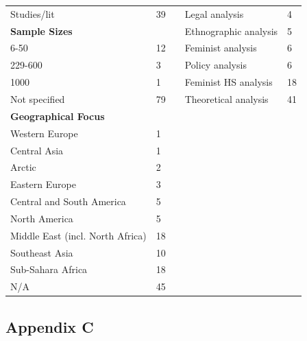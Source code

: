 \documentclass[10pt,a4paper]{article}
\begin{document}
\begin{table}[H]
\begin{footnotesize}
\begin{tabular}{L{5cm} L{1cm} L{1cm} L{5cm} L{1cm}}
Studies/lit & 39 &  & Legal analysis & 4 \\ 
\textbf{Sample Sizes} &  &  & Ethnographic analysis & 5 \\ 
6-50 & 12 &  & Feminist analysis & 6 \\
229-600 & 3 &  & Policy analysis & 6 \\
1000 & 1 &  & Feminist HS analysis & 18 \\  
Not specified & 79 &  & Theoretical analysis & 41  \\  
\textbf{Geographical Focus} & & & & \\  
Western Europe & 1 & & & \\
Central Asia & 1 & & & \\
Arctic & 2 & & & \\
Eastern Europe & 3 & & & \\
Central and South America & 5 & & & \\
North America & 5 & & & \\
Middle East (incl. North Africa) & 18 & & & \\
Southeast Asia & 10 &  &  & \\
Sub-Sahara Africa & 18 &  &  & \\
N/A & 45 & & & \\ 
\end{tabular}
\end{footnotesize}
\end{table}

\clearpage
\subsection{Appendix C} \label{Appendix C}
\end{document}
